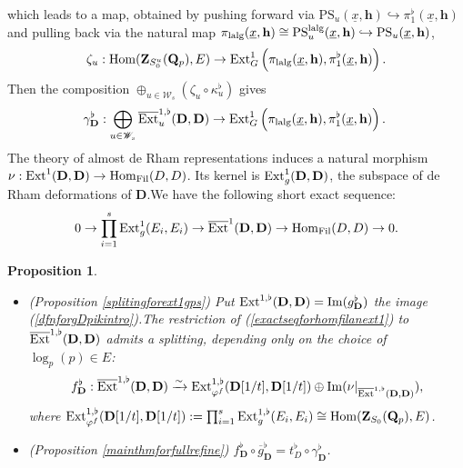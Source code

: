 \documentclass[10pt]{article}
\newtheorem{pro}[thm]{Proposition}
\newcommand{\fil}{{\rm Fil}}
\newcommand{\homo}{{\rm Hom}}
\newcommand{\ext}{{\rm Ext}}
\newcommand{\lalg}{{\rm lalg}}
\newcommand{\Dpik}{{\mathbf{D}}}
\newcommand{\bQ}{{\mathbf{Q}}}
\newcommand{\bZ}{{\mathbf{Z}}}
\newcommand{\bh}{{\mathbf{h}}}
\newcommand{\sW}{\mathscr W}
\begin{document}
which leads to a map, obtained by pushing forward via $\mathrm{PS}_{u}(\underline{x},\bh)\hookrightarrow \pi^{\flat}_{1}(\underline{x},\bh)$ and pulling back via the natural map $\pi_{\lalg}(\underline{x},\bh)\cong \mathrm{PS}^{\lalg}_{u}(\underline{x},\bh)\hookrightarrow \mathrm{PS}_{u}(\underline{x},\bh)$,
\[\zeta_{u}:\homo(\bZ_{S^u_0}(\bQ_p),E)\rightarrow  \ext^1_{G}\left(\pi_{\lalg}(\underline{x},\bh),\pi^{\flat}_{1}(\underline{x},\bh)\right).\]
Then the composition $\oplus_{u\in\sW_{s}}(\zeta_u\circ \kappa^{\flat}_u)$ gives
\begin{equation}\label{gammDpikcirc}
	\begin{aligned}
		\gamma^{\flat}_{\Dpik}:\bigoplus_{u\in\sW_{s}}\overline{\ext}^{1,\flat}_{u}(\Dpik,\Dpik)\rightarrow \ext^1_{G}\left(\pi_{\lalg}(\underline{x},\bh),\pi^{\flat}_{1}(\underline{x},\bh)\right).\;
	\end{aligned}
\end{equation}
The theory of almost de Rham representations induces a natural morphism $\nu:{\ext}^{1}(\Dpik,\Dpik)\rightarrow \homo_{\fil}(D,D)$. Its kernel is ${\ext}^{1}_g(\Dpik,\Dpik)$, the subspace of de Rham deformations of $\Dpik$.\;We have the following short exact sequence:
\begin{equation}\label{exactseqforhomfilanext1}
	0\rightarrow \prod_{i=1}^s\ext^1_g(E_i,E_i)\rightarrow  \overline{\ext}^{1}(\Dpik,\Dpik) \rightarrow \homo_{\fil}(D,D)\rightarrow 0.
\end{equation}


\begin{pro}\label{thmintor2}
\begin{itemize}
	\item[(1)] (Proposition \ref{splitingforext1gps})	Put ${\ext}^{1,\flat}(\Dpik,\Dpik)=\mathrm{Im}(g^{\flat}_{\Dpik})$ the image (\ref{dfnforgDpikintro}).\;The restriction of (\ref{exactseqforhomfilanext1}) to $\overline{\ext}^{1,\flat}(\Dpik,\Dpik)$ admits a splitting, depending only on the choice of $\log_p(p)\in E$:
	\[f_{\Dpik}^{\flat}:\overline{\ext}^{1,\flat}(\Dpik,\Dpik)\xrightarrow{\sim} \ext^{1,\flat}_{\varphi^f}(\Dpik[1/t],\Dpik[1/t]) \oplus\mathrm{Im}(\nu|_{\overline{\ext}^{1,\flat}(\Dpik,\Dpik)}),\]
	where $\ext^{1,\flat}_{\varphi^f}(\Dpik[1/t],\Dpik[1/t]):=\prod_{i=1}^s\ext^{1,\flat}_g(E_i,E_i)\cong \homo(\bZ_{S_0}(\bQ_p),E)$.\;
	\item[(2)]	(Proposition \ref{mainthmforfullrefine}) $f_{\Dpik}^{\flat}\circ \overline{g}^{\flat}_{\Dpik}=t^{\flat}_{D}\circ\gamma^{\flat}_{\Dpik}$.\;
\end{itemize}	
\end{pro}
\end{document}
